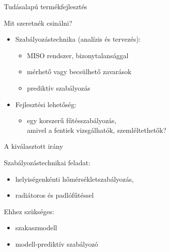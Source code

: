 \documentclass[14pt,handout]{beamer}
\begin{document}
\begin{frame}{Tudásalapú termékfejlesztés}

Mit szeretnék csinálni?
\pause
\vspace{6pt}

\begin{itemize}
	\setlength{\itemsep}{12pt}
	\item Szabályozástechnika (analízis és tervezés):
	\begin{itemize}
		\item MISO rendszer, bizonytalansággal
		\item mérhető vagy becsülhető zavarások
		\item prediktív szabályozás
	\end{itemize}
	\pause

	\item Fejlesztési lehetőség:
	\begin{itemize}
		\item egy korszerű fűtésszabályozás, \\
		amivel a fentiek vizsgálhatók, szemléltethetők?
	\end{itemize}
\end{itemize}
\end{frame}

\begin{frame}{A kiválasztott irány}

Szabályozástechnikai feladat:

\begin{itemize}
	\item helyiségenkénti hőmérsékletszabályozás,
	\item radiátoros és padlófűtéssel
\end{itemize}
\vspace{6pt}

Ehhez szükséges:

\begin{itemize}
	\item szakaszmodell
	\item modell-prediktív szabályozó
\end{itemize}


\end{frame}
\end{document}
